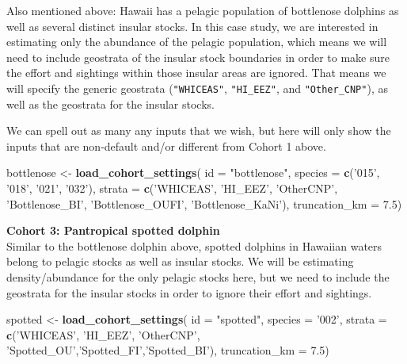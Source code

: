 \documentclass[
]{book}
\newenvironment{Shaded}{\begin{snugshade}}{\end{snugshade}}
\newcommand{\DataTypeTok}[1]{\textcolor[rgb]{0.13,0.29,0.53}{#1}}
\newcommand{\FloatTok}[1]{\textcolor[rgb]{0.00,0.00,0.81}{#1}}
\newcommand{\KeywordTok}[1]{\textcolor[rgb]{0.13,0.29,0.53}{\textbf{#1}}}
\newcommand{\NormalTok}[1]{#1}
\newcommand{\StringTok}[1]{\textcolor[rgb]{0.31,0.60,0.02}{#1}}
\begin{document}
Also mentioned above: Hawaii has a pelagic population of bottlenose dolphins as well as several distinct insular stocks. In this case study, we are interested in estimating only the abundance of the pelagic population, which means we will need to include geostrata of the insular stock boundaries in order to make sure the effort and sightings within those insular areas are ignored. That means we will specify the generic geostrata (\texttt{"WHICEAS"}, \texttt{"HI\_EEZ"}, and \texttt{"Other\_CNP"}), as well as the geostrata for the insular stocks.

We can spell out as many any inputs that we wish, but here will only show the inputs that are non-default and/or different from Cohort 1 above.

\begin{Shaded}
\begin{Highlighting}[]
\NormalTok{bottlenose <-}\StringTok{ }\KeywordTok{load_cohort_settings}\NormalTok{(}
  \DataTypeTok{id =} \StringTok{"bottlenose"}\NormalTok{,}
  \DataTypeTok{species =} \KeywordTok{c}\NormalTok{(}\StringTok{'015'}\NormalTok{, }\StringTok{'018'}\NormalTok{, }\StringTok{'021'}\NormalTok{, }\StringTok{'032'}\NormalTok{),}
  \DataTypeTok{strata =} \KeywordTok{c}\NormalTok{(}\StringTok{'WHICEAS'}\NormalTok{, }\StringTok{'HI_EEZ'}\NormalTok{, }\StringTok{'OtherCNP'}\NormalTok{,}
             \StringTok{'Bottlenose_BI'}\NormalTok{, }\StringTok{'Bottlenose_OUFI'}\NormalTok{, }\StringTok{'Bottlenose_KaNi'}\NormalTok{),}
  \DataTypeTok{truncation_km =} \FloatTok{7.5}\NormalTok{)}
\end{Highlighting}
\end{Shaded}

\textbf{Cohort 3: Pantropical spotted dolphin}\\
Similar to the bottlenose dolphin above, spotted dolphins in Hawaiian waters belong to pelagic stocks as well as insular stocks. We will be estimating density/abundance for the only pelagic stocks here, but we need to include the geostrata for the insular stocks in order to ignore their effort and sightings.

\begin{Shaded}
\begin{Highlighting}[]
\NormalTok{spotted <-}\StringTok{ }\KeywordTok{load_cohort_settings}\NormalTok{(}
  \DataTypeTok{id =} \StringTok{"spotted"}\NormalTok{,}
  \DataTypeTok{species =} \StringTok{'002'}\NormalTok{,}
  \DataTypeTok{strata =} \KeywordTok{c}\NormalTok{(}\StringTok{'WHICEAS'}\NormalTok{, }\StringTok{'HI_EEZ'}\NormalTok{, }\StringTok{'OtherCNP'}\NormalTok{,}
             \StringTok{'Spotted_OU'}\NormalTok{,}\StringTok{'Spotted_FI'}\NormalTok{,}\StringTok{'Spotted_BI'}\NormalTok{),}
  \DataTypeTok{truncation_km =} \FloatTok{7.5}\NormalTok{)}
\end{Highlighting}
\end{Shaded}
\end{document}
